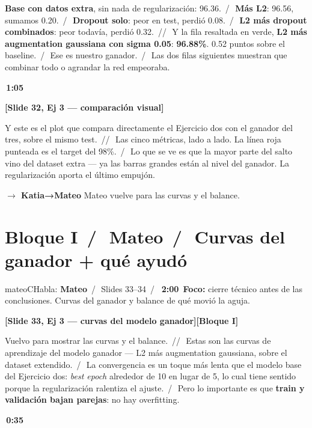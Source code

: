 \documentclass[11pt,a4paper]{article}
\newcommand{\slidenum}[1]{\textcolor{accent}{\textbf{[Slide #1]}}}
\newcommand{\timing}[1]{\textcolor{muted}{\textbf{\,#1\,}}}
\newcommand{\bloque}[1]{\textcolor{muted}{\small\textbf{[Bloque #1]}}}
\newcommand{\pausa}{\textcolor{muted}{\,/\,}}
\newcommand{\Pausa}{\textcolor{muted}{\,/\!/\,}}
\newcommand{\paso}[1]{\textcolor{accent}{\textbf{$\to$ #1}}}
\begin{document}
\textbf{Base con datos extra}, sin nada de regularización: 96.36. \pausa\ \textbf{Más L2}: 96.56, sumamos 0.20. \pausa\ \textbf{Dropout solo}: peor en test, perdió 0.08. \pausa\ \textbf{L2 más dropout combinados}: peor todavía, perdió 0.32. \Pausa\ Y la fila resaltada en verde, \textbf{L2 más augmentation gaussiana con sigma 0.05}: \textbf{96.88\%}. 0.52 puntos sobre el baseline. \pausa\ Ese es nuestro ganador. \pausa\ Las dos filas siguientes muestran que combinar todo o agrandar la red empeoraba.

\timing{1:05}

\slidenum{32, Ej 3 — comparación visual}

Y este es el plot que compara directamente el Ejercicio dos con el ganador del tres, sobre el mismo test. \Pausa\ Las cinco métricas, lado a lado. La línea roja punteada es el target del 98\%. \pausa\ Lo que se ve es que la mayor parte del salto vino del dataset extra --- ya las barras grandes están al nivel del ganador. La regularización aporta el último empujón.

\paso{Katia→Mateo} \quad Mateo vuelve para las curvas y el balance.

\section{Bloque I \pausa\ \textcolor{mateoC}{Mateo} \pausa\ Curvas del ganador + qué ayudó}\label{sec:bloqueI}

\begin{personabox}{mateoC}{Habla: \textcolor{mateoC}{\textbf{Mateo}} \pausa\ Slides 33--34 \pausa\ \timing{2:00}}
\textbf{Foco:} cierre técnico antes de las conclusiones. Curvas del ganador y balance de qué movió la aguja.
\end{personabox}

\slidenum{33, Ej 3 — curvas del modelo ganador}\quad \bloque{I}

Vuelvo para mostrar las curvas y el balance. \Pausa\ Estas son las curvas de aprendizaje del modelo ganador --- L2 más augmentation gaussiana, sobre el dataset extendido. \pausa\ La convergencia es un toque más lenta que el modelo base del Ejercicio dos: \emph{best epoch} alrededor de 10 en lugar de 5, lo cual tiene sentido porque la regularización ralentiza el ajuste. \pausa\ Pero lo importante es que \textbf{train y validación bajan parejas}: no hay overfitting.

\timing{0:35}
\end{document}

